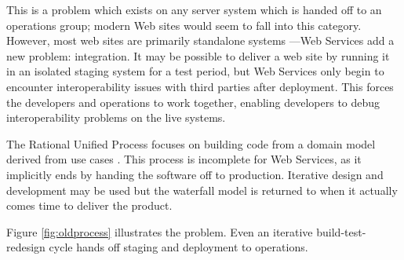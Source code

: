 \documentclass[draft]{report}
\begin{document}
This is a problem which exists on any server system which is handed off
to an operations group; modern Web sites would seem to fall into this
category. However, most web sites are primarily standalone systems
---Web Services add a new problem: integration. It may be possible to
deliver a web site by running it in an isolated staging system for a
test period, but Web Services only begin to encounter interoperability
issues with third parties after deployment. This forces the developers
and operations to work together, enabling developers to debug
interoperability problems on the live systems.

The Rational Unified Process focuses on building code from a domain
model derived from use cases \cite{krutchen:rup}. This process is
incomplete for Web Services, as it implicitly ends by handing the
software off to production. Iterative design and development may be used
but the waterfall model is returned to when it actually comes time to
deliver the product.

Figure \ref{fig:oldprocess} illustrates the problem. Even an iterative
build-test-redesign cycle hands off staging and deployment to
operations. 
\end{document}
